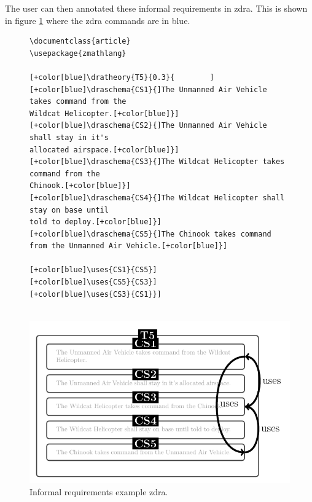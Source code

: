 The user can then annotated these informal requirements in \gls{zdra}. This is
shown in figure \ref{fig:informalzdraexample} where the \gls{zdra} commands are in {\color{blue}blue}.

\begin{figure}[H]
    \centering
    \begin{minipage}{0.45\textwidth}
    \centering
    \begin{tiny}
    \begin{BVerbatim}[commandchars=+\[\]]
\documentclass{article}
\usepackage{zmathlang}

[+color[blue]\dratheory{T5}{0.3}{        ]
[+color[blue]\draschema{CS1}{]The Unmanned Air Vehicle takes command from the
Wildcat Helicopter.[+color[blue]}]
[+color[blue]\draschema{CS2}{]The Unmanned Air Vehicle shall stay in it's
allocated airspace.[+color[blue]}]
[+color[blue]\draschema{CS3}{]The Wildcat Helicopter takes command from the 
Chinook.[+color[blue]}]
[+color[blue]\draschema{CS4}{]The Wildcat Helicopter shall stay on base until
told to deploy.[+color[blue]}]
[+color[blue]\draschema{CS5}{]The Chinook takes command from the Unmanned Air Vehicle.[+color[blue]}]
           
[+color[blue]\uses{CS1}{CS5}]
[+color[blue]\uses{CS5}{CS3}]
[+color[blue]\uses{CS3}{CS1}}]
      
    \end{BVerbatim}
    \end{tiny}
    \end{minipage}\hfill
    \begin{minipage}{0.45\textwidth}
    \centering
    \includegraphics[width=\linewidth]{Figures/fullexample/zdrainformalexample.png}
    \end{minipage}
    \caption{Informal requirements example \gls{zdra}.\label{fig:informalzdraexample}}
    \end{figure}

